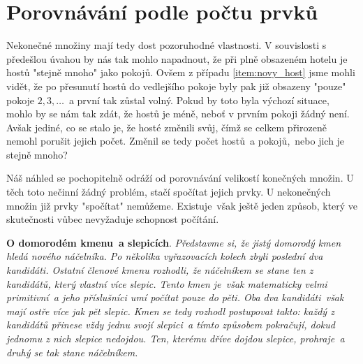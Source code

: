 \section{Porovnávání podle počtu prvků}\label{sec:porovnavani_podle_poctu_prvku}
Nekonečné množiny mají tedy dost pozoruhodné vlastnosti. V souvislosti s předešlou úvahou by nás tak mohlo napadnout, že při plně obsazeném hotelu je hostů "stejně mnoho" jako pokojů. Ovšem z případu \ref{item:novy_host} jsme mohli vidět, že po přesunutí hostů do vedlejšího pokoje byly pak již obsazeny "pouze" pokoje $2,3,\dots$~a první tak zůstal volný. Pokud by toto byla výchozí situace, mohlo by se nám tak zdát, že hostů je méně, neboť v prvním pokoji žádný není. Avšak jediné, co se stalo je, že hosté změnili svůj, čímž se celkem přirozeně nemohl porušit jejich počet. Změnil se tedy počet hostů~a pokojů,~nebo jich je stejně mnoho?\par
Náš náhled se pochopitelně odráží od porovnávání velikostí konečných množin. U těch toto nečinní žádný problém, stačí spočítat jejich prvky. U nekonečných množin již prvky "spočítat" nemůžeme. Existuje~však ještě jeden způsob, který ve skutečnosti vůbec nevyžaduje schopnost počítání.
\medskip

\noindent\textbf{O domorodém kmenu~a slepicích}. \textit{Představme si, že jistý domorodý kmen hledá nového náčelníka. Po několika vyřazovacích kolech zbyli poslední dva kandidáti. Ostatní členové kmenu rozhodli, že náčelníkem se stane ten z kandidátů, který vlastní více slepic. Tento kmen je~však matematicky velmi primitivní~a jeho příslušníci umí počítat pouze do pěti. Oba dva kandidáti~však mají ostře více jak pět slepic. Kmen se tedy rozhodl postupovat takto: každý z kandidátů přinese vždy jednu svojí slepici~a tímto způsobem pokračují, dokud jednomu z nich slepice nedojdou. Ten, kterému dříve dojdou slepice, prohraje~a druhý se tak stane náčelníkem.} \cite{Pick2019}
\medskip


